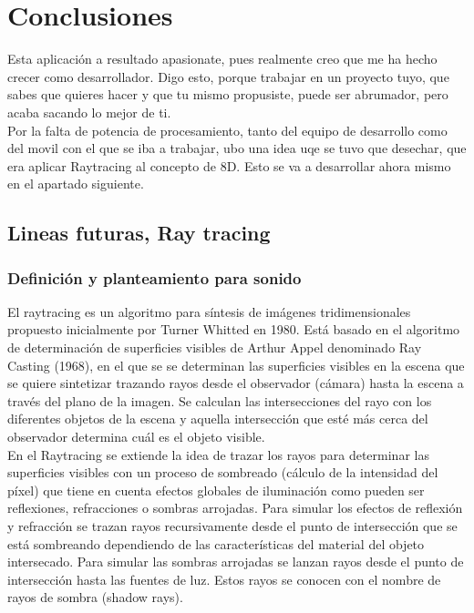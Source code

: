 \section{Conclusiones}

\quad Esta aplicación a resultado apasionate, pues realmente creo que me ha hecho crecer como desarrollador. Digo esto, porque trabajar en un proyecto tuyo, que sabes que quieres hacer y que tu mismo propusiste, puede ser abrumador, pero acaba sacando lo mejor de ti.\\

\quad Por la falta de potencia de procesamiento, tanto del equipo de desarrollo como del movil con el que se iba a trabajar, ubo una idea uqe se tuvo que desechar, que era aplicar Raytracing al concepto de 8D. Esto se va a desarrollar ahora mismo en el apartado siguiente.\\

\subsection{Lineas futuras, Ray tracing}

\subsubsection{Definición y planteamiento para sonido}

\quad El raytracing es un algoritmo para síntesis de imágenes tridimensionales propuesto inicialmente por Turner Whitted en 1980. Está basado en el algoritmo de determinación de superficies visibles de Arthur Appel denominado Ray Casting (1968), en el que se se determinan las superficies visibles en la escena que se quiere sintetizar trazando rayos desde el observador (cámara) hasta la escena a través del plano de la imagen. Se calculan las intersecciones del rayo con los diferentes objetos de la escena y aquella intersección que esté más cerca del observador determina cuál es el objeto visible.\\

\quad En el Raytracing se extiende la idea de trazar los rayos para determinar las superficies visibles con un proceso de sombreado (cálculo de la intensidad del píxel) que tiene en cuenta efectos globales de iluminación como pueden ser reflexiones, refracciones o sombras arrojadas. Para simular los efectos de reflexión y refracción se trazan rayos recursivamente desde el punto de intersección que se está sombreando dependiendo de las características del material del objeto intersecado. Para simular las sombras arrojadas se lanzan rayos desde el punto de intersección hasta las fuentes de luz. Estos rayos se conocen con el nombre de rayos de sombra (shadow rays).\\


